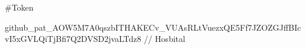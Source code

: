 \#\+Token

github\+\_\+pat\+\_\+A\+O\+W5\+M7\+A0qszb\+I\+T\+H\+A\+K\+E\+Cv\+\_\+\+V\+U\+As\+R\+Lt\+Vuezx\+Q\+E5\+Ff7\+J\+Z\+O\+Z\+G\+Jff\+B\+Icv\+I5x\+G\+V\+L\+Qi\+Tj\+Bfi7\+Q2\+D\+V\+S\+D2jva\+L\+Tdz8 // Hosbital 